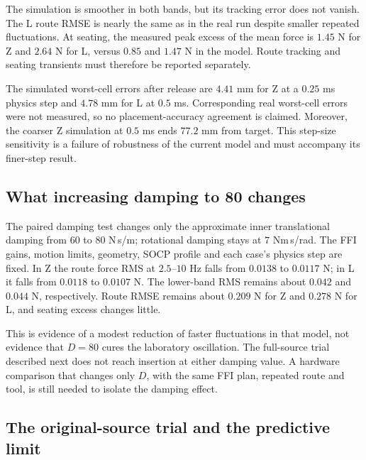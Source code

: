 The simulation is smoother in both bands, but its tracking error does not vanish. The L route RMSE is nearly the same as in the real run despite smaller repeated fluctuations. At seating, the measured peak excess of the mean force is $1.45$ N for Z and $2.64$ N for L, versus $0.85$ and $1.47$ N in the model. Route tracking and seating transients must therefore be reported separately.


The simulated worst-cell errors after release are $4.41$ mm for Z at a $0.25$ ms physics step and $4.78$ mm for L at $0.5$ ms. Corresponding real worst-cell errors were not measured, so no placement-accuracy agreement is claimed. Moreover, the coarser Z simulation at $0.5$ ms ends $77.2$ mm from target. This step-size sensitivity is a failure of robustness of the current model and must accompany its finer-step result.

\subsection{What increasing damping to 80 changes}

The paired damping test changes only the approximate inner translational damping from $60$ to $80$ N\,s/m; rotational damping stays at $7$ Nm\,s/rad. The FFI gains, motion limits, geometry, SOCP profile and each case's physics step are fixed. In Z the route force RMS at $2.5$--$10$ Hz falls from $0.0138$ to $0.0117$ N; in L it falls from $0.0118$ to $0.0107$ N. The lower-band RMS remains about $0.042$ and $0.044$ N, respectively. Route RMSE remains about $0.209$ N for Z and $0.278$ N for L, and seating excess changes little.

This is evidence of a modest reduction of faster fluctuations in that model, not evidence that $D=80$ cures the laboratory oscillation. The full-source trial described next does not reach insertion at either damping value. A hardware comparison that changes only $D$, with the same FFI plan, repeated route and tool, is still needed to isolate the damping effect.

\subsection{The original-source trial and the predictive limit}

